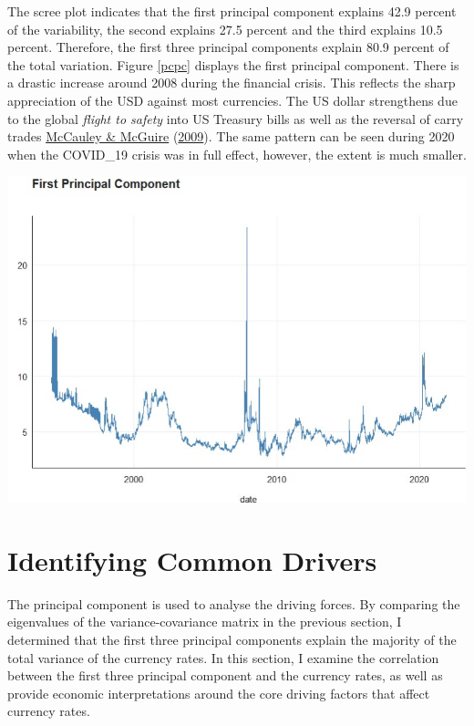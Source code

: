 \documentclass[11pt,preprint, authoryear]{elsarticle}
\let\origfigure\figure
\let\endorigfigure\endfigure
\renewenvironment{figure}[1][2] {
    \expandafter\origfigure\expandafter[H]
} {
    \endorigfigure
}
\numberwithin{equation}{section}
\numberwithin{figure}{section}
\numberwithin{table}{section}
\begin{document}
The scree plot indicates that the first principal component explains
42.9 percent of the variability, the second explains 27.5 percent and
the third explains 10.5 percent. Therefore, the first three principal
components explain 80.9 percent of the total variation. Figure
\ref{pcpc} displays the first principal component. There is a drastic
increase around 2008 during the financial crisis. This reflects the
sharp appreciation of the USD against most currencies. The US dollar
strengthens due to the global \emph{flight to safety} into US Treasury
bills as well as the reversal of carry trades
\protect\hyperlink{ref-mcc2009}{McCauley \& McGuire}
(\protect\hyperlink{ref-mcc2009}{2009}). The same pattern can be seen
during 2020 when the COVID\_19 crisis was in full effect, however, the
extent is much smaller.

\begin{figure}
\centering
\includegraphics[scale=0.9]{pc1.jpg}
\caption{First Principal Component }
\label{pcpc}
\end{figure}

\hypertarget{identifying-common-drivers}{%
\section{Identifying Common Drivers}\label{identifying-common-drivers}}

The principal component is used to analyse the driving forces. By
comparing the eigenvalues of the variance-covariance matrix in the
previous section, I determined that the first three principal components
explain the majority of the total variance of the currency rates. In
this section, I examine the correlation between the first three
principal component and the currency rates, as well as provide economic
interpretations around the core driving factors that affect currency
rates.
\end{document}
